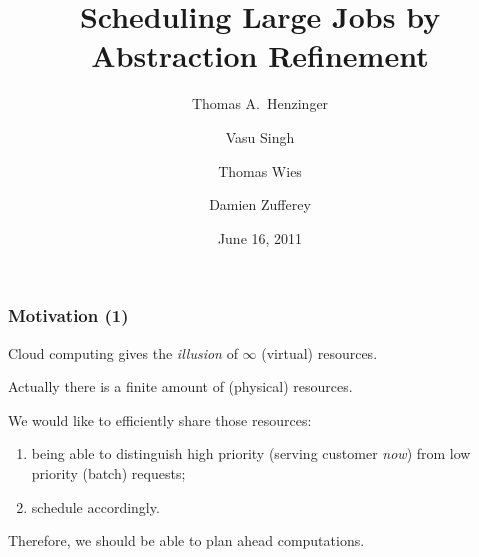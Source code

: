 \documentclass{beamer}
\title[Scheduling by Abstraction Refinement]{Scheduling Large Jobs by Abstraction Refinement}
\author[Damien Zufferey]{
  Thomas A.~Henzinger \and
  Vasu Singh \and
  Thomas Wies \and
  \alert{Damien Zufferey}
}
\institute{ IST Austria }
\date{June 16, 2011}
\begin{document}
\frame[plain]{\titlepage}

\begin{frame}
  \frametitle{Motivation (1)}
  Cloud computing gives the \emph{illusion} of $\infty$ (virtual) resources.

  \vspace{2ex}
  
  Actually there is a finite amount of (physical) resources.

  \vspace{2ex}
  
  We would like to efficiently share those resources:
  \begin{enumerate}
  \item being able to distinguish high priority (serving customer \emph{now}) from low priority (batch) requests;
  \item schedule accordingly.
  \end{enumerate}
  
  \vspace{2ex}
  
  Therefore, we should be able to \alert{plan ahead} computations.

\end{frame}

\end{document}
